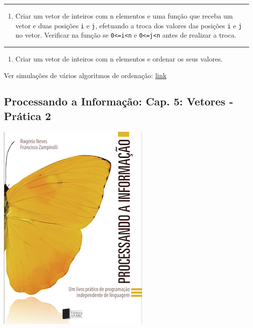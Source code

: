 \documentclass[12pt,a4paper]{article}
\renewcommand{\linethickness}{0.05em}
\providecommand{\tightlist}{%
      \setlength{\itemsep}{0pt}\setlength{\parskip}{0pt}}
\begin{document}
    \begin{center}\rule{0.5\linewidth}{\linethickness}\end{center}

\begin{enumerate}
\def\labelenumi{\arabic{enumi}.}
\setcounter{enumi}{3}
\tightlist
\item
  Criar um vetor de inteiros com n elementos e uma função que receba um
  vetor e duas posições \texttt{i} e \texttt{j}, efetuando a troca dos
  valores das posições \texttt{i} e \texttt{j} no vetor. Verificar na
  função se \texttt{0\textless{}=i\textless{}n} e
  \texttt{0\textless{}=j\textless{}n} antes de realizar a troca.
\end{enumerate}

    \begin{center}\rule{0.5\linewidth}{\linethickness}\end{center}

\begin{enumerate}
\def\labelenumi{\arabic{enumi}.}
\setcounter{enumi}{4}
\tightlist
\item
  Criar um vetor de inteiros com n elementos e ordenar os seus valores.
\end{enumerate}

Ver simulações de vários algoritmos de ordenação:
\href{https://www.toptal.com/developers/sorting-algorithms}{link}

    \hypertarget{processando-a-informauxe7uxe3o-cap.-5-vetores---pruxe1tica-2}{%
\subsection{Processando a Informação: Cap. 5: Vetores - Prática
2}\label{processando-a-informauxe7uxe3o-cap.-5-vetores---pruxe1tica-2}}

    \includegraphics{"figs/Capa_Processando_Informacao.jpg"}
\end{document}
